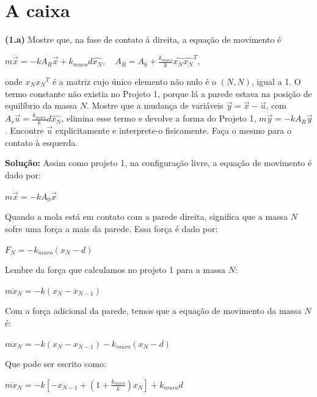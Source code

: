 \section{A caixa}

\textbf{(1.a)} Mostre que, na fase de contato à direita, a equação de movimento é
\begin{center}
    $m \ddot{\vec{x}} = -k A_R \vec{x} + k_{muro} d \hat{x_N}, \quad  A_R = A_0 + \frac{k_{muro}}{k} \hat{x_N} \hat{x_N}^T$,
\end{center}
onde $x_N {x_N}^T$ é a matriz cujo único elemento não nulo é o $(N, N)$, igual a 1. O termo constante
não existia no Projeto 1, porque lá a parede estava na posição de equilíbrio da massa $N$. Mostre
que a mudança de variáveis $\vec{y} = \vec{x} - \vec{u}$, com $A_r \vec{u} = \frac{k_{muro}}{k} d \hat{x_N}$, elimina esse termo e devolve
a forma do Projeto 1, $m \ddot{\vec{y}} = -k A_R \vec{y}$. Encontre $\vec{u}$ explicitamente e interprete-o fisicamente. Faça
o mesmo para o contato à esquerda.

\vspace{0.3cm}
\textbf{Solução:} Assim como  projeto 1, na configuração livre, a equação de movimento é dado por:
\begin{center}
    $m \ddot{\vec{x}} = -k A_0 \vec{x}$ 
\end{center}


Quando a mola está em contato com a parede direita, significa que a massa $N$ sofre uma força a mais da parede. Essa força é dado por:

\begin{center}
    $F_N = -k_{muro} (x_N - d)$ 
\end{center}

Lembre da força que calculamos no projeto 1 para a massa $N$:
\begin{center}
    $m \ddot{x}_N = -k (x_N - x_{N-1}) $
\end{center}

Com a força adicional da parede, temos que a equação de movimento da massa $N$ é:
\begin{center}
    $m \ddot{x}_N = -k (x_N - x_{N-1}) - k_{muro} (x_N - d)$
\end{center}

Que pode ser escrito como:

\begin{center}
    $m \ddot{x}_N = -k [-x_{N-1}+(1+\frac{k_{muro}}{k}) x_N] + k_{muro} d$ 
\end{center}

